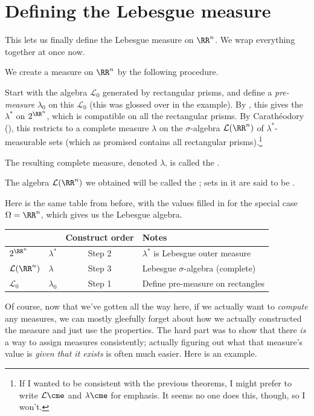 \section{Defining the Lebesgue measure}
\label{sec:define_lebesgue_measure}
This lets us finally define the Lebesgue measure on $\RR^n$.
We wrap everything together at once now.
\begin{definition}
	We create a measure on $\RR^n$ by the following procedure.
	\begin{itemize}
		\ii Start with the algebra $\mathcal{L}_0$
		generated by rectangular prisms,
		and define a \emph{pre-measure} $\lambda_0$ on this $\mathcal{L}_0$
		(this was glossed over in the example).
		\ii By ,
		this gives the 
		$\lambda^\ast$ on $2^{\RR^n}$,
		which is compatible on all the rectangular prisms.
		\ii By Carath\'{e}odory (),
		this restricts to a complete measure $\lambda$
		on the $\sigma$-algebra $\mathcal{L}(\RR^n)$
		of $\lambda^\ast$-measurable sets
		(which as promised contains all rectangular prisms).\footnote{If
			I wanted to be consistent with the previous theorems,
			I might prefer to write $\mathcal{L}\cme$
			and $\lambda\cme$ for emphasis.
			It seems no one does this, though, so I won't.}
	\end{itemize}
	The resulting complete measure, denoted $\lambda$,
	is called the .

	The algebra $\mathcal{L}(\RR^n)$ we obtained will be called the
	;
	sets in it are said to be .
\end{definition}

Here is the same table from before,
with the values filled in for the special case $\Omega = \RR^n$,
which gives us the Lebesgue algebra.
\begin{center}
	\begin{tabular}[h]{llcl}
		& & Construct order & Notes \\ \hline
		$2^{\RR^n}$ & $\lambda^\ast$ & Step 2 &
			$\lambda^\ast$ is Lebesgue outer measure \\[1em]
		$\mathcal L(\RR^n)$ & $\lambda$ & Step 3 & Lebesgue $\sigma$-algebra (complete) \\[1em]
		$\mathcal L_0$ & $\lambda_0$ & Step 1 & Define pre-measure on rectangles
	\end{tabular}
\end{center}


Of course, now that we've gotten all the way here,
if we actually want to \emph{compute} any measures,
we can mostly gleefully forget about how we actually constructed
the measure and just use the properties.
The hard part was to show that there \emph{is}
a way to assign measures consistently;
actually figuring out what that measure's value is
\emph{given that it exists} is often much easier.
Here is an example.

